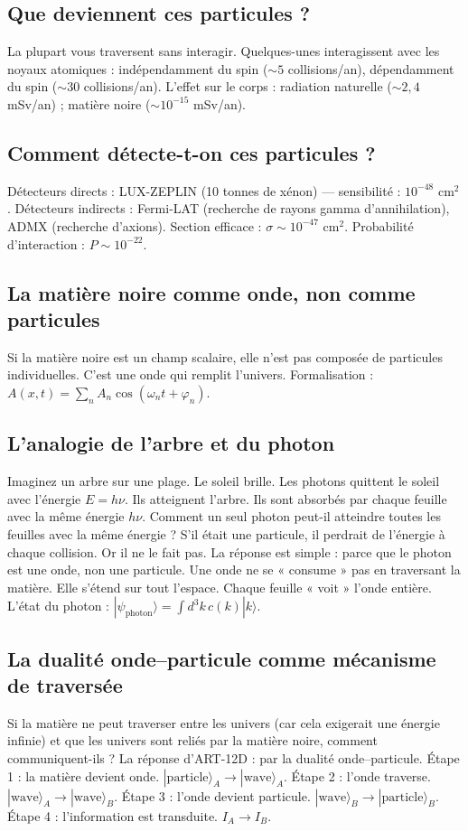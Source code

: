 \subsection{Que deviennent ces particules ?}
La plupart vous traversent sans interagir. Quelques-unes interagissent avec les noyaux atomiques : indépendamment du spin ($\sim 5$ collisions/an), dépendamment du spin ($\sim 30$ collisions/an). L'effet sur le corps : radiation naturelle ($\sim 2,4$ mSv/an) ; matière noire ($\sim 10^{-15}$ mSv/an).

\subsection{Comment détecte-t-on ces particules ?}
Détecteurs directs : LUX-ZEPLIN (10 tonnes de xénon) --- sensibilité : $10^{-48}$ cm$^2$. Détecteurs indirects : Fermi-LAT (recherche de rayons gamma d'annihilation), ADMX (recherche d'axions). Section efficace : $\sigma \sim 10^{-47}$ cm$^2$. Probabilité d'interaction : $P \sim 10^{-22}$.

\subsection{La matière noire comme onde, non comme particules}
Si la matière noire est un champ scalaire, elle n'est pas composée de particules individuelles. C'est une onde qui remplit l'univers. Formalisation : $A(x,t) = \sum_n A_n \cos(\omega_n t + \varphi_n)$.

\subsection{L'analogie de l'arbre et du photon}
Imaginez un arbre sur une plage. Le soleil brille. Les photons quittent le soleil avec l'énergie $E = h\nu$. Ils atteignent l'arbre. Ils sont absorbés par chaque feuille avec la même énergie $h\nu$. Comment un seul photon peut-il atteindre toutes les feuilles avec la même énergie ? S'il était une particule, il perdrait de l'énergie à chaque collision. Or il ne le fait pas. La réponse est simple : parce que le photon est une onde, non une particule. Une onde ne se « consume » pas en traversant la matière. Elle s'étend sur tout l'espace. Chaque feuille « voit » l'onde entière. L'état du photon : $|\psi_{\text{photon}}\rangle = \int d^3k \, c(k) |k\rangle$.

\subsection{La dualité onde--particule comme mécanisme de traversée}
Si la matière ne peut traverser entre les univers (car cela exigerait une énergie infinie) et que les univers sont reliés par la matière noire, comment communiquent-ils ? La réponse d'ART-12D : par la dualité onde--particule. Étape 1 : la matière devient onde. $|\text{particle}\rangle_A \to |\text{wave}\rangle_A$. Étape 2 : l'onde traverse. $|\text{wave}\rangle_A \to |\text{wave}\rangle_B$. Étape 3 : l'onde devient particule. $|\text{wave}\rangle_B \to |\text{particle}\rangle_B$. Étape 4 : l'information est transduite. $I_A \to I_B$.

